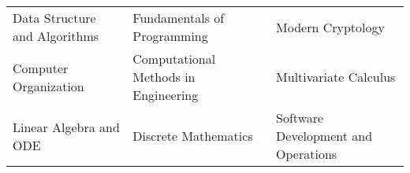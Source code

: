 
\begin{tabular*}{\textwidth}{l l l}
  Data Structure and Algorithms & Fundamentals of Programming & Modern Cryptology \\
  Computer Organization & Computational Methods in Engineering & Multivariate Calculus \\
  Linear Algebra and ODE  & Discrete Mathematics & Software Development and Operations  \\

\end{tabular*}

